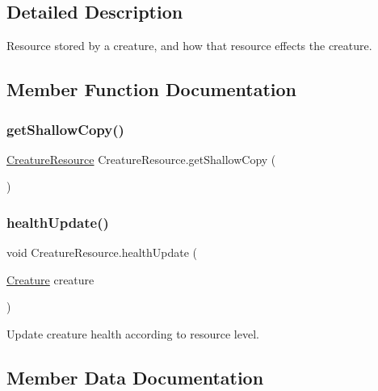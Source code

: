 \subsection{Detailed Description}
Resource stored by a creature, and how that resource effects the creature. 



\subsection{Member Function Documentation}
\mbox{\label{class_creature_resource_a994286201a611ddfada1fced56e427e7}} 
\subsubsection{\texorpdfstring{get\+Shallow\+Copy()}{getShallowCopy()}}
{\footnotesize\ttfamily \mbox{\hyperlink{class_creature_resource}{Creature\+Resource}} Creature\+Resource.\+get\+Shallow\+Copy (\begin{DoxyParamCaption}{ }\end{DoxyParamCaption})}

\mbox{\label{class_creature_resource_ae5678920b5302ad56650bdaec0fde5e5}} 
\subsubsection{\texorpdfstring{health\+Update()}{healthUpdate()}}
{\footnotesize\ttfamily void Creature\+Resource.\+health\+Update (\begin{DoxyParamCaption}\item[{\mbox{\hyperlink{class_creature}{Creature}}}]{creature }\end{DoxyParamCaption})}



Update creature health according to resource level. 



\subsection{Member Data Documentation}
\mbox{\label{class_creature_resource_a6ed5ee9d74de65191323bd6bfd5764e5}} 
